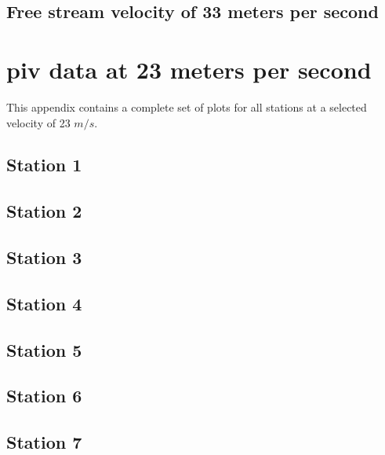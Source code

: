 \section{Free stream velocity of 33 meters per second}


\chapter{piv data at 23 meters per second}
\label{appendix:23mps}

This appendix contains a complete set of plots for all stations at a selected 
velocity of 23 $m/s$.

\section{Station 1}

\section{Station 2}

\section{Station 3}

\section{Station 4}

\section{Station 5}

\section{Station 6}

\section{Station 7}

